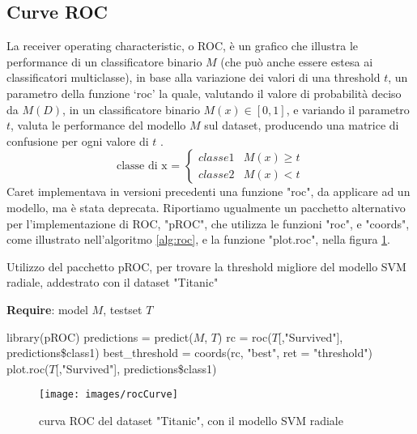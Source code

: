 \documentclass[12pt]{article}
\begin{document}
\subsection{Curve ROC}
La receiver operating characteristic, o ROC, è un grafico che illustra le performance di un classificatore binario $M$ (che può anche essere estesa ai classificatori multiclasse), 
in base alla variazione dei valori di una threshold $t$, 
un parametro della funzione ‘roc’ la quale, valutando il valore di probabilità deciso da $M(D)$, in un classificatore binario $M(x) \in [0,1]$, e variando il parametro $t$, 
valuta le performance del modello $M$ sul dataset, producendo una matrice di confusione per ogni valore di $t$ \cite{cit:roc}.
 \begin{equation}
    \text{classe di x = }
     \begin{cases}
     classe1 & M(x) \ge t \\
     classe2 & M(x) < t
     \end{cases}
\end{equation}
Caret implementava in versioni precedenti una funzione "roc", da applicare ad un modello, ma è stata deprecata. 
Riportiamo ugualmente un pacchetto alternativo per l'implementazione di ROC, "pROC", che utilizza le funzioni "roc", e "coords", come illustrato nell'algoritmo \ref{alg:roc}, e la funzione "plot.roc", nella figura \ref{img:rocCurve}.

\begin{algorithm}[H]
    \caption{Utilizzo del pacchetto pROC, per trovare la threshold migliore del modello SVM radiale, addestrato con il dataset "Titanic"}\label{alg:roc}
    \textbf{Require}: model $M$, testset $T$
    \begin{algorithmic}[1]
    \State library(pROC)
    \State predictions = predict($M$, $T$)
    \State rc = roc($T$[,"Survived"], predictions\$class1)
    \State best\_threshold = coords(rc, "best", ret = "threshold") 
    \State plot.roc($T$[,"Survived"], predictions\$class1)
    \end{algorithmic}
\end{algorithm}


\begin{figure}[H]
    \centering
    \texttt{[image: images/rocCurve]}
    \caption{curva ROC del dataset "Titanic", con il modello SVM radiale}
    \label{img:rocCurve}
\end{figure}
\end{document}
